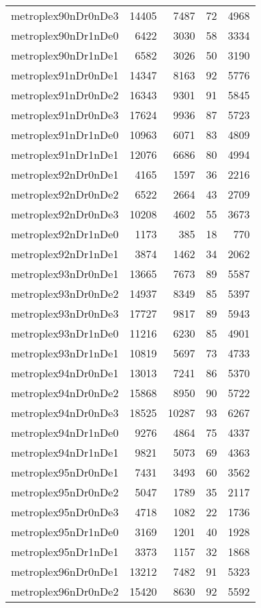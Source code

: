 \documentclass[../../../thesis.tex]{subfiles}
\begin{document}
\begin{longtable}{lrrrr}
metroplex90nDr0nDe3 & 14405 & 7487 & 72 & 4968 \\
metroplex90nDr1nDe0 & 6422 & 3030 & 58 & 3334 \\
metroplex90nDr1nDe1 & 6582 & 3026 & 50 & 3190 \\
metroplex91nDr0nDe1 & 14347 & 8163 & 92 & 5776 \\
metroplex91nDr0nDe2 & 16343 & 9301 & 91 & 5845 \\
metroplex91nDr0nDe3 & 17624 & 9936 & 87 & 5723 \\
metroplex91nDr1nDe0 & 10963 & 6071 & 83 & 4809 \\
metroplex91nDr1nDe1 & 12076 & 6686 & 80 & 4994 \\
metroplex92nDr0nDe1 & 4165 & 1597 & 36 & 2216 \\
metroplex92nDr0nDe2 & 6522 & 2664 & 43 & 2709 \\
metroplex92nDr0nDe3 & 10208 & 4602 & 55 & 3673 \\
metroplex92nDr1nDe0 & 1173 & 385 & 18 & 770 \\
metroplex92nDr1nDe1 & 3874 & 1462 & 34 & 2062 \\
metroplex93nDr0nDe1 & 13665 & 7673 & 89 & 5587 \\
metroplex93nDr0nDe2 & 14937 & 8349 & 85 & 5397 \\
metroplex93nDr0nDe3 & 17727 & 9817 & 89 & 5943 \\
metroplex93nDr1nDe0 & 11216 & 6230 & 85 & 4901 \\
metroplex93nDr1nDe1 & 10819 & 5697 & 73 & 4733 \\
metroplex94nDr0nDe1 & 13013 & 7241 & 86 & 5370 \\
metroplex94nDr0nDe2 & 15868 & 8950 & 90 & 5722 \\
metroplex94nDr0nDe3 & 18525 & 10287 & 93 & 6267 \\
metroplex94nDr1nDe0 & 9276 & 4864 & 75 & 4337 \\
metroplex94nDr1nDe1 & 9821 & 5073 & 69 & 4363 \\
metroplex95nDr0nDe1 & 7431 & 3493 & 60 & 3562 \\
metroplex95nDr0nDe2 & 5047 & 1789 & 35 & 2117 \\
metroplex95nDr0nDe3 & 4718 & 1082 & 22 & 1736 \\
metroplex95nDr1nDe0 & 3169 & 1201 & 40 & 1928 \\
metroplex95nDr1nDe1 & 3373 & 1157 & 32 & 1868 \\
metroplex96nDr0nDe1 & 13212 & 7482 & 91 & 5323 \\
metroplex96nDr0nDe2 & 15420 & 8630 & 92 & 5592 \\

\end{longtable}
\end{document}
